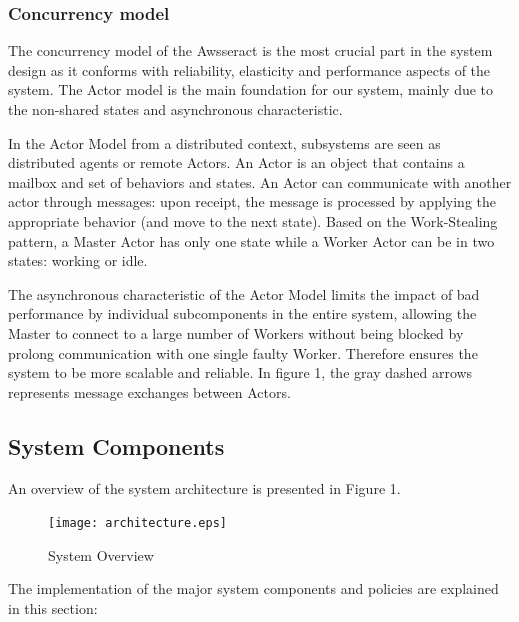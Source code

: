 \documentclass[conference]{IEEEtran}
\begin{document}
\subsubsection{Concurrency model}\label{sec:sysdesign_conc}

The concurrency model of the Awsseract is the most crucial part in the system design as it conforms with reliability, elasticity and performance aspects of the system. The Actor model \cite{agha} is the main foundation for our system, mainly due to the non-shared states and asynchronous characteristic. 

In the Actor Model from a distributed context, subsystems are seen as distributed agents or remote Actors. An Actor is an object that contains a mailbox and set of behaviors and states. An Actor can communicate with another actor through messages: upon receipt, the message is processed by applying the appropriate behavior (and move to the next state). Based on the Work-Stealing pattern, a Master Actor has only one state while a Worker Actor can be in two states: working or idle. 

The asynchronous characteristic of the Actor Model limits the impact of bad performance by individual subcomponents in the entire system, allowing the Master to connect to a large number of Workers without being blocked by prolong communication with one single faulty Worker. Therefore ensures the system to be more scalable and reliable. In figure 1, the gray dashed arrows represents message exchanges between Actors.

\subsection{System Components}\label{sec:sysdesign_comp}

An overview of the system architecture is presented in Figure 1. 

\begin{figure}
\centering
        \texttt{[image: architecture.eps]}
    \caption{System Overview}
    \label{fig:sysoverview}
\end{figure}




The implementation of the major system components and policies are explained in this section: \\


\end{document}

